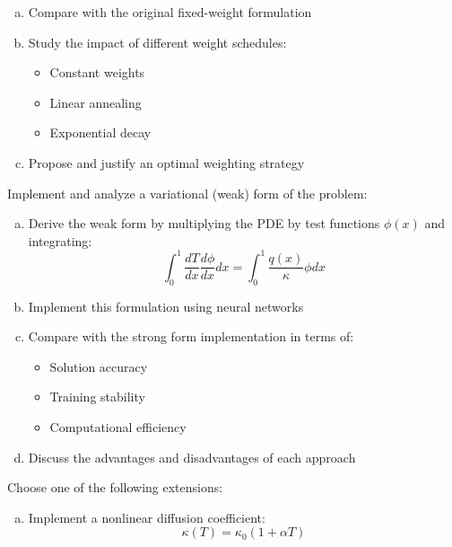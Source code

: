 \begin{problemset}
\begin{problem}
\begin{enumerate}[a)]
\item Compare with the original fixed-weight formulation

\item Study the impact of different weight schedules:
    \begin{itemize}
    \item Constant weights
    \item Linear annealing
    \item Exponential decay
    \end{itemize}

\item Propose and justify an optimal weighting strategy
\end{enumerate}

\end{problem}

\begin{problem}
Implement and analyze a variational (weak) form of the problem:

\begin{enumerate}[a)]
\item Derive the weak form by multiplying the PDE by test functions $\phi(x)$ and integrating:
    \begin{equation*}
    \int_0^1 \frac{dT}{dx}\frac{d\phi}{dx}dx = \int_0^1 \frac{q(x)}{\kappa}\phi dx
    \end{equation*}

\item Implement this formulation using neural networks

\item Compare with the strong form implementation in terms of:
    \begin{itemize}
    \item Solution accuracy
    \item Training stability
    \item Computational efficiency 
    \end{itemize}

\item Discuss the advantages and disadvantages of each approach
\end{enumerate}

\end{problem}

\begin{problem}
Choose one of the following extensions:

\begin{enumerate}[a)]
\item Implement a nonlinear diffusion coefficient:
    \begin{equation*}
    \kappa(T) = \kappa_0(1 + \alpha T)
    \end{equation*}


\end{enumerate}
\end{problem}
\end{problemset}
